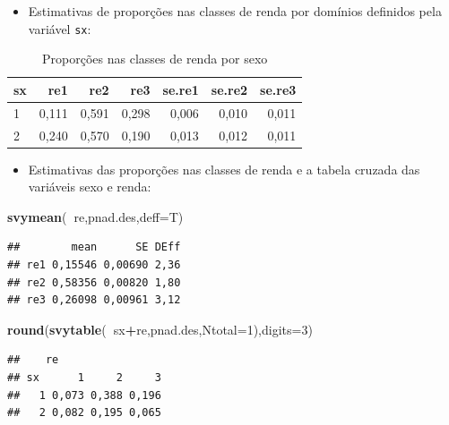\documentclass[]{book}
\newenvironment{Shaded}{\begin{snugshade}}{\end{snugshade}}
\newcommand{\KeywordTok}[1]{\textcolor[rgb]{0.13,0.29,0.53}{\textbf{#1}}}
\newcommand{\DataTypeTok}[1]{\textcolor[rgb]{0.13,0.29,0.53}{#1}}
\newcommand{\DecValTok}[1]{\textcolor[rgb]{0.00,0.00,0.81}{#1}}
\newcommand{\OperatorTok}[1]{\textcolor[rgb]{0.81,0.36,0.00}{\textbf{#1}}}
\newcommand{\NormalTok}[1]{#1}
\providecommand{\tightlist}{%
  \setlength{\itemsep}{0pt}\setlength{\parskip}{0pt}}
\theoremstyle{definition}
\theoremstyle{definition}
\theoremstyle{definition}
\theoremstyle{remark}
\begin{document}
\begin{itemize}
\tightlist
\item
  Estimativas de proporções nas classes de renda por domínios definidos
  pela variável \texttt{sx}:
\end{itemize}

\begin{table}

\caption{\label{tab:unnamed-chunk-10}Proporções nas classes de renda por sexo}
\centering
\begin{tabular}[t]{lrrrrrr}
\toprule
sx & re1 & re2 & re3 & se.re1 & se.re2 & se.re3\\
\midrule
1 & 0,111 & 0,591 & 0,298 & 0,006 & 0,010 & 0,011\\
2 & 0,240 & 0,570 & 0,190 & 0,013 & 0,012 & 0,011\\
\bottomrule
\end{tabular}
\end{table}

\begin{itemize}
\tightlist
\item
  Estimativas das proporções nas classes de renda e a tabela cruzada das
  variáveis sexo e renda:
\end{itemize}

\begin{Shaded}
\begin{Highlighting}[]
\KeywordTok{svymean}\NormalTok{(}\OperatorTok{~}\NormalTok{re,pnad.des,}\DataTypeTok{deff=}\NormalTok{T)}
\end{Highlighting}
\end{Shaded}

\begin{verbatim}
##        mean      SE DEff
## re1 0,15546 0,00690 2,36
## re2 0,58356 0,00820 1,80
## re3 0,26098 0,00961 3,12
\end{verbatim}

\begin{Shaded}
\begin{Highlighting}[]
\KeywordTok{round}\NormalTok{(}\KeywordTok{svytable}\NormalTok{(}\OperatorTok{~}\NormalTok{sx}\OperatorTok{+}\NormalTok{re,pnad.des,}\DataTypeTok{Ntotal=}\DecValTok{1}\NormalTok{),}\DataTypeTok{digits=}\DecValTok{3}\NormalTok{)}
\end{Highlighting}
\end{Shaded}

\begin{verbatim}
##    re
## sx      1     2     3
##   1 0,073 0,388 0,196
##   2 0,082 0,195 0,065
\end{verbatim}
\end{document}

